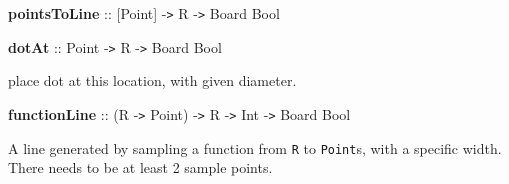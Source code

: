  

{{\bf pointsToLine} :: [Point] -{\tt >} R -{\tt >} Board Bool}

 

{{\bf dotAt} :: Point -{\tt >} R -{\tt >} Board Bool}

\hspace{0.05\textwidth}\begin{minipage}{0.9\textwidth}place dot at this location, with given diameter.\end{minipage}

 

{{\bf functionLine} :: (R -{\tt >} Point) -{\tt >} R -{\tt >} Int -{\tt >} Board Bool}

\hspace{0.05\textwidth}\begin{minipage}{0.9\textwidth}A line generated by sampling a function from {\tt R} to {\tt Point}s, with a specific width. There needs to be at least 2 sample points.
\end{minipage}

 

 


